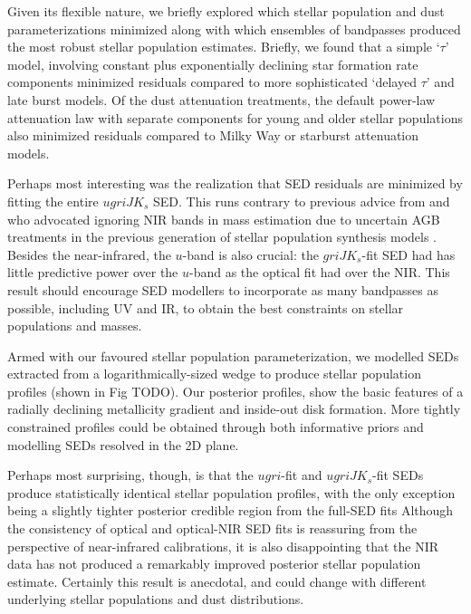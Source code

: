 \documentclass{iau}
\begin{document}
Given its flexible nature, we briefly explored which stellar population and dust parameterizations minimized along with which ensembles of bandpasses produced the most robust stellar population estimates.
Briefly, we found that a simple `$\tau$' model, involving constant plus exponentially declining star formation rate components minimized residuals compared to more sophisticated `delayed $\tau$' and late burst models.
Of the dust attenuation treatments, the default power-law attenuation law with separate components for young and older stellar populations also minimized residuals compared to Milky Way or starburst attenuation models.

Perhaps most interesting was the realization that SED residuals are minimized by fitting the entire $ugriJK_s$ SED.
This runs contrary to previous advice from \cite{Taylor:2011} and \cite{Zibetti:2009} who advocated ignoring NIR bands in mass estimation due to uncertain AGB treatments in the previous generation of stellar population synthesis models \citep[e.g.][]{Bruzual:2003,Maraston:2005}.
Besides the near-infrared, the $u$-band is also crucial: the $griJK_s$-fit SED had has little predictive power over the $u$-band as the optical fit had over the NIR.
This result should encourage SED modellers to incorporate as many bandpasses as possible, including UV and IR, to obtain the best constraints on stellar populations and masses.

Armed with our favoured stellar population parameterization, we modelled SEDs extracted from a logarithmically-sized wedge \citep[e.g.][their Fig TODO]{Courteau:2011} to produce stellar population profiles (shown in Fig TODO).
Our posterior profiles, show the basic features of a radially declining metallicity gradient and inside-out disk formation.
More tightly constrained profiles could be obtained through both informative priors and modelling SEDs resolved in the 2D plane.

Perhaps most surprising, though, is that the $ugri$-fit and $ugriJK_s$-fit SEDs produce statistically identical stellar population profiles, with the only exception being a slightly tighter posterior credible region from the full-SED fits
Although the consistency of optical and optical-NIR SED fits is reassuring from the perspective of near-infrared calibrations, it is also disappointing that the NIR data has not produced a remarkably improved posterior stellar population estimate.
Certainly this result is anecdotal, and could change with different underlying stellar populations and dust distributions.
\end{document}
